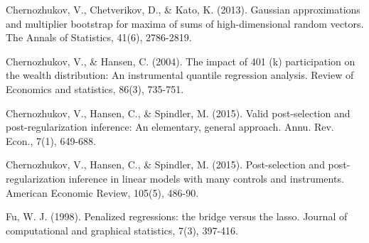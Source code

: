 \documentclass[12pt,a4paper]{article}
\begin{document}
Chernozhukov, V., Chetverikov, D., \& Kato, K. (2013). Gaussian approximations and multiplier bootstrap for maxima of sums of high-dimensional random vectors. The Annals of Statistics, 41(6), 2786-2819.

Chernozhukov, V., \& Hansen, C. (2004). The impact of 401 (k) participation on the wealth distribution: An instrumental quantile regression analysis. Review of Economics and statistics, 86(3), 735-751.

Chernozhukov, V., Hansen, C., \& Spindler, M. (2015). Valid post-selection and post-regularization inference: An elementary, general approach. Annu. Rev. Econ., 7(1), 649-688.

Chernozhukov, V., Hansen, C., \& Spindler, M. (2015). Post-selection and post-regularization inference in linear models with many controls and instruments. American Economic Review, 105(5), 486-90.

Fu, W. J. (1998). Penalized regressions: the bridge versus the lasso. Journal of computational and graphical statistics, 7(3), 397-416.
\end{document}
